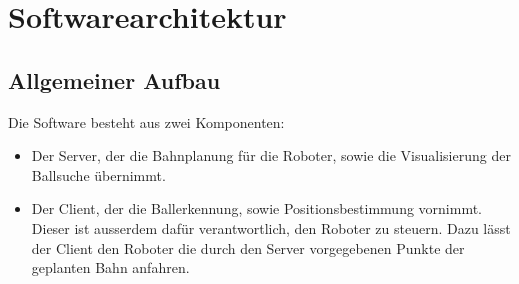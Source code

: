 
\chapter{Softwarearchitektur}
\label{cha:softwarearchitektur}

\section{Allgemeiner Aufbau}
\label{sec:allgemeiner-aufbau}

Die Software besteht aus zwei Komponenten:
\begin{itemize}
\item Der Server, der die Bahnplanung für die Roboter, sowie die
  Visualisierung der Ballsuche übernimmt.
\item Der Client, der die Ballerkennung, sowie Positionsbestimmung
  vornimmt. Dieser ist ausserdem dafür verantwortlich, den Roboter zu
  steuern. Dazu lässt der Client den Roboter die durch den Server vorgegebenen
  Punkte der geplanten Bahn anfahren. 
\end{itemize}



